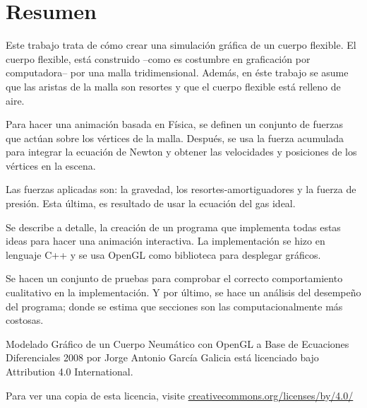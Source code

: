\chapter*{Resumen}
Este trabajo trata de cómo crear una simulación gráfica de un cuerpo flexible.
El cuerpo flexible, está construido --como es costumbre en graficación por computadora-- por una malla tridimensional. Además, en éste trabajo se asume que las aristas de la malla son resortes y que el cuerpo flexible está relleno de aire.

Para hacer una animación basada en Física, se definen un conjunto de fuerzas que actúan sobre los vértices de la malla. Después, se usa la fuerza acumulada para integrar la ecuación de Newton y obtener las velocidades y posiciones de los vértices en la escena.

Las fuerzas aplicadas son: la gravedad, los resortes-amortiguadores y la fuerza de presión. Esta última, es resultado de usar la ecuación del gas ideal.

Se describe a detalle, la creación de un programa que implementa todas estas ideas para hacer una animación interactiva. La implementación se hizo en lenguaje C++ y se usa OpenGL como biblioteca para desplegar gráficos.

Se hacen un conjunto de pruebas para comprobar el correcto comportamiento cualitativo en la implementación. Y por último, se hace un análisis del desempeño del programa; donde se estima que secciones son las computacionalmente más costosas.

Modelado Gráfico de un Cuerpo Neumático con OpenGL a Base de Ecuaciones Diferenciales \textcopyright{} 2008 por Jorge Antonio García Galicia está licenciado bajo Attribution 4.0 International.

Para ver una copia de esta licencia, visite \href{http://creativecommons.org/licenses/by/4.0/}{creativecommons.org/licenses/by/4.0/}
